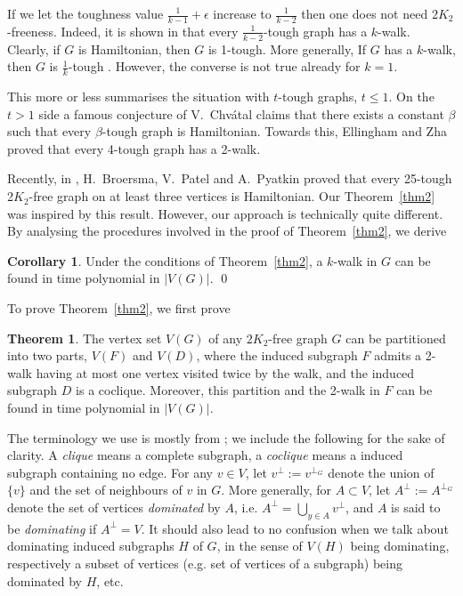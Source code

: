 \documentclass{amsart}
\theoremstyle{definition}
\newtheorem{theorem}{Theorem}
\newtheorem{corollary}{Corollary}
\begin{document}
If we let the toughness value $\frac{1}{k-1}+\epsilon$ increase to 
$\frac{1}{k-2}$ then
one does not need $2K_2$-freeness. Indeed, it is shown in 
\cite{jackson1990k} that
every $\frac{1}{k-2}$-tough graph has a $k$-walk. 
Clearly, if $G$ is
Hamiltonian, then $G$ is 1-tough.  More generally, 
If $G$ has a $k$-walk, then $G$ is $\frac{1}{k}$-tough \cite{jackson1990k}.
However, the converse is not true already for $k=1$.  

This more or less summarises the situation with $t$-tough graphs, $t\leq 1$.
On the $t>1$ side 
a famous conjecture of V.~Chv\'{a}tal \cite{chvatal1973tough} claims
that there exists a constant $\beta$ such that every
$\beta$-tough graph is Hamiltonian.  
Towards this, 
Ellingham and Zha \cite{ellingham2000toughness} proved that
every 4-tough graph has a 2-walk.

Recently, in \cite{broersma2014toughness}, H.~Broersma, V.~Patel and A.~Pyatkin proved that 
every 25-tough 2$K_2$-free graph on at least three vertices is Hamiltonian.
Our Theorem~\ref{thm2} was inspired by this result.  
However, our approach is technically quite different. 
By analysing the procedures involved in the proof of Theorem~\ref{thm2}, 
we derive
\begin{corollary}\label{alg}
Under the conditions of Theorem~\ref{thm2}, a $k$-walk in $G$ can be found in
time polynomial in $|V(G)|$. \qed
\end{corollary}

To prove Theorem~\ref{thm2}, we first prove
\begin{theorem}\label{addgen1} 
The  vertex set $V(G)$ of any $2K_2$-free graph $G$
can be partitioned into two parts, $V(F)$ and $V(D)$, where the
induced subgraph $F$ admits a 2-walk having at most one vertex visited twice by
the walk, and the induced subgraph $D$ is a coclique. Moreover, this
partition and the 2-walk in $F$ can be found in time polynomial in $|V(G)|$.
\end{theorem}

The terminology we use is  mostly from \cite{bomu08}; we include the following for the sake of
clarity.  
A {\em clique} means a complete subgraph, a {\em coclique} means a
induced subgraph containing no edge. 
For any
$v\in V$, let $v^\perp:=v^{\perp_G}$ denote the union of $\{v\}$ and the set of
neighbours of $v$ in $G$.  More generally, for $A\subset V$, let
$A^\perp:=A^{\perp_G}$ denote the set of vertices {\em dominated} by $A$, i.e.
$A^\perp=\bigcup\limits_{y\in A}v^\perp$, and $A$ is said to be {\em
dominating} if $A^\perp=V$.  It should also lead to no confusion when we talk
about  dominating induced subgraphs $H$ of $G$, in the sense of $V(H)$ being
dominating, respectively a subset of vertices (e.g. set of vertices of a
subgraph) being dominated by $H$, etc.
\end{document}

